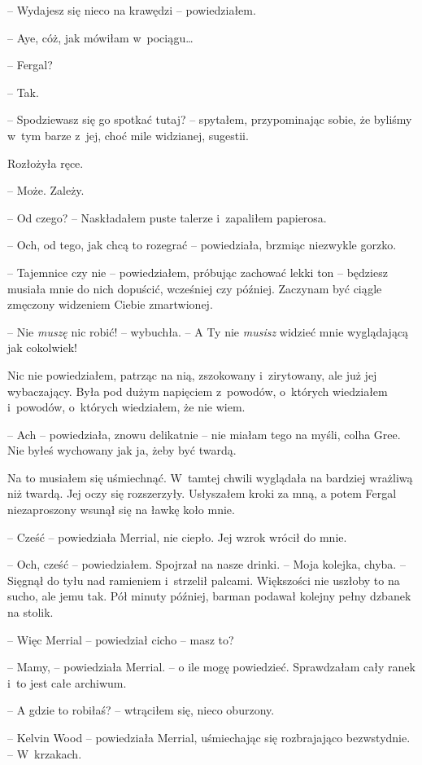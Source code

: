 \documentclass[oneside,polish,11pt,sfheadings]{mwbk}
\begin{document}
-- Wydajesz się nieco na krawędzi -- powiedziałem.

-- Aye, cóż, jak mówiłam w~pociągu\ldots

-- Fergal?

-- Tak.

-- Spodziewasz się go spotkać tutaj? -- spytałem, przypominając sobie, że
byliśmy w~tym barze z~jej, choć mile widzianej, sugestii.

Rozłożyła ręce. 

-- Może. Zależy.

-- Od czego? -- Naskładałem puste talerze i~zapaliłem papierosa.

-- Och, od tego, jak chcą to rozegrać -- powiedziała, brzmiąc niezwykle
gorzko.

-- Tajemnice czy nie -- powiedziałem, próbując zachować lekki ton -- będziesz musiała mnie do nich dopuścić, wcześniej czy później. Zaczynam
być ciągle zmęczony widzeniem Ciebie zmartwionej.

-- Nie \textit{muszę} nic robić! -- wybuchła. -- A Ty nie \textit{musisz}
widzieć mnie wyglądającą jak cokolwiek!

Nic nie powiedziałem, patrząc na nią, zszokowany i~zirytowany, ale już
jej wybaczający. Była pod dużym napięciem z~powodów, o~których
wiedziałem i~powodów, o~których wiedziałem, że nie wiem.

-- Ach -- powiedziała, znowu delikatnie -- nie miałam tego na myśli, colha
Gree. Nie byłeś wychowany jak ja, żeby być twardą.

Na to musiałem się uśmiechnąć. W~tamtej chwili wyglądała na bardziej
wrażliwą niż twardą. Jej oczy się rozszerzyły. Usłyszałem kroki za mną,
a potem Fergal niezaproszony wsunął się na ławkę koło mnie.

-- Cześć -- powiedziała Merrial, nie ciepło. Jej wzrok wrócił do mnie.

-- Och, cześć -- powiedziałem. Spojrzał na nasze drinki. -- Moja kolejka,
chyba. -- Sięgnął do tyłu nad ramieniem i~strzelił palcami. Większości
nie uszłoby to na sucho, ale jemu tak. Pół minuty później, barman
podawał kolejny pełny dzbanek na stolik.

-- Więc Merrial -- powiedział cicho -- masz to?

-- Mamy, -- powiedziała Merrial. -- o ile mogę powiedzieć. Sprawdzałam cały
ranek i~to jest całe archiwum.

-- A gdzie to robiłaś? -- wtrąciłem się, nieco oburzony.

-- Kelvin Wood -- powiedziała Merrial, uśmiechając się rozbrajająco
bezwstydnie. -- W~krzakach.
\end{document}
